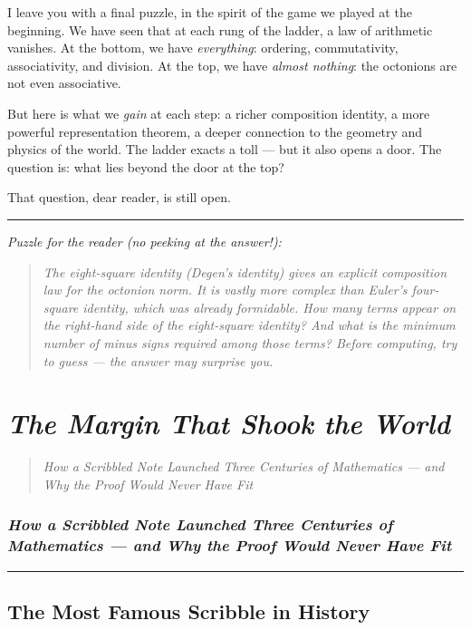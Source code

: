 \documentclass[11pt,openany]{book}
\theoremstyle{definition}
\theoremstyle{plain}
\theoremstyle{remark}
\begin{document}
I leave you with a final puzzle, in the spirit of the game we played at the beginning. We have seen that at each rung of the ladder, a law of arithmetic vanishes. At the bottom, we have \textit{everything}: ordering, commutativity, associativity, and division. At the top, we have \textit{almost nothing}: the octonions are not even associative.

But here is what we \textit{gain} at each step: a richer composition identity, a more powerful representation theorem, a deeper connection to the geometry and physics of the world. The ladder exacts a toll — but it also opens a door. The question is: what lies beyond the door at the top?

That question, dear reader, is still open.

\bigskip\noindent\rule{\textwidth}{0.4pt}\bigskip


\textit{Puzzle for the reader (no peeking at the answer!):}

\begin{quote}
\textit{The eight-square identity (Degen's identity) gives an explicit composition law for the octonion norm. It is vastly more complex than Euler's four-square identity, which was already formidable. How many terms appear on the right-hand side of the eight-square identity? And what is the minimum number of minus signs required among those terms? Before computing, try to guess — the answer may surprise you.}
\end{quote}


\clearpage

\chapter{\textit{The Margin That Shook the World}}
\begin{quote}\textit{How a Scribbled Note Launched Three Centuries of Mathematics — and Why the Proof Would Never Have Fit}\end{quote}



\subsection*{\textit{How a Scribbled Note Launched Three Centuries of Mathematics — and Why the Proof Would Never Have Fit}}


\bigskip\noindent\rule{\textwidth}{0.4pt}\bigskip


\section*{The Most Famous Scribble in History}
\end{document}
